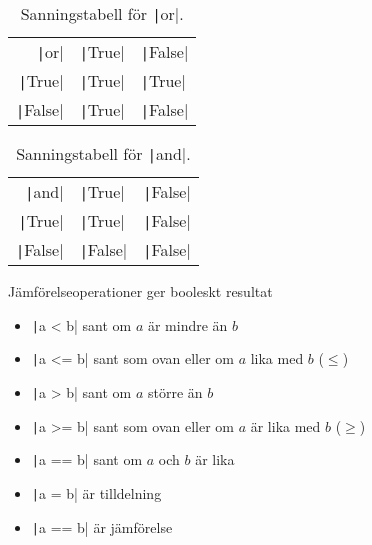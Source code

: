 \begin{frame}
  \begin{table}
    \begin{tabular}{rll}
      \texttt|or| & \texttt|True| & \texttt|False| \\
      \texttt|True| & \texttt|True| & \texttt|True| \\
      \texttt|False| & \texttt|True| & \texttt|False|
    \end{tabular}
    \caption{Sanningstabell för \texttt|or|.}
  \end{table}

  \pause

  \begin{table}
    \begin{tabular}{rll}
      \texttt|and| & \texttt|True| & \texttt|False| \\
      \texttt|True| & \texttt|True| & \texttt|False| \\
      \texttt|False| & \texttt|False| & \texttt|False|
    \end{tabular}
    \caption{Sanningstabell för \texttt|and|.}
  \end{table}
\end{frame}


\begin{frame}[fragile]
  \begin{block}{Jämförelseoperationer ger booleskt resultat}
    \begin{itemize}
      \item \texttt|a < b| sant om \(a\) är mindre än \(b\)
      \item \texttt|a <= b| sant som ovan eller om \(a\) lika med \(b\) 
        (\(\leq\))
      \item \texttt|a > b| sant om \(a\) större än \(b\)
      \item \texttt|a >= b| sant som ovan eller om \(a\) är lika med \(b\) 
        (\(\geq\))
      \item \texttt|a == b| sant om \(a\) och \(b\) är lika
    \end{itemize}
  \end{block}

  \pause

  \begin{remark}
    \begin{itemize}
      \item \texttt|a = b| är tilldelning
      \item \texttt|a == b| är jämförelse
    \end{itemize}
  \end{remark}
\end{frame}


